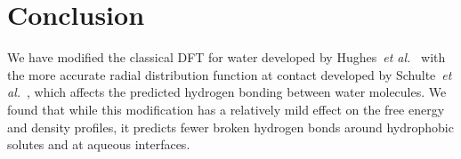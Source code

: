 \documentclass[twocolumn,amsmath,amssymb]{revtex4-1}
\begin{document}
\section{Conclusion}

We have modified the classical DFT for water developed by
Hughes~\emph{et al.}~\cite{hughes2013classical} with the more accurate
radial distribution function at contact developed by Schulte~\emph{et
  al.}~\cite{schulte2012using}, which affects the predicted hydrogen
bonding between water molecules.  We found that while this
modification has a relatively mild effect on the free energy and
density profiles, it predicts fewer broken hydrogen bonds around
hydrophobic solutes and at aqueous interfaces.

\end{document}
